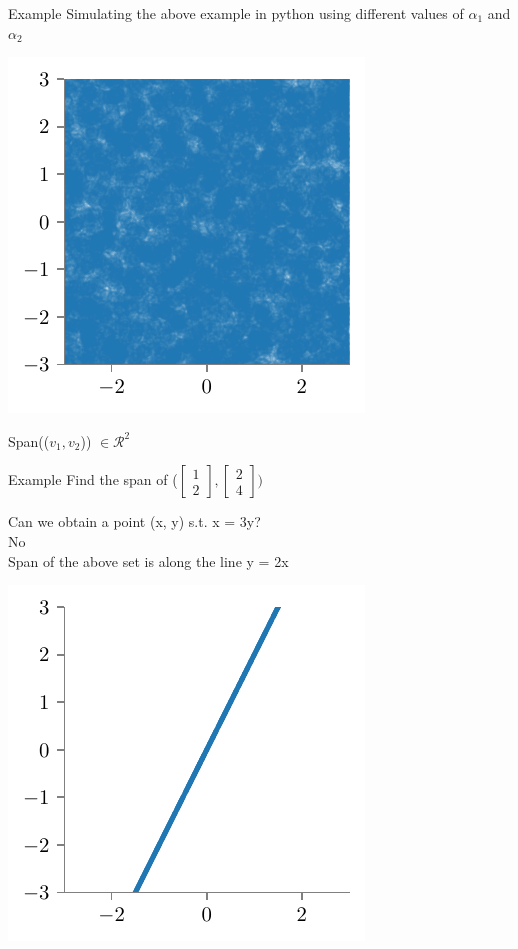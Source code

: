 \documentclass{beamer}
\begin{document}
\begin{frame}{Example}
    Simulating the above example in python using different values of $\alpha_1$ and $\alpha_2$


    \includegraphics{../assets/linear-regression/figures/geoemetric-span-3.pdf}
    
    Span(($v_1, v_2$)) $\in \mathcal{R}^2$
\end{frame}


\begin{frame}{Example}
Find the span of ($\begin{bmatrix}
1 \\2
\end{bmatrix}, \begin{bmatrix}
2 \\4
\end{bmatrix}) $

\pause Can we obtain a point (x, y) s.t. x = 3y? \\
\pause No \\ 
\pause Span of the above set is along the line y = 2x

\includegraphics[scale=0.6]{../assets/linear-regression/figures/geoemetric-span-4.pdf}


\end{frame}
\end{document}
